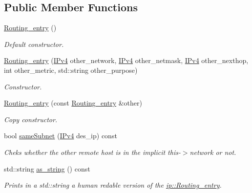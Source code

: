 \subsection*{Public Member Functions}
\begin{DoxyCompactItemize}
\item 
\hyperlink{structip_1_1Routing__entry_ac767d7b0debe508f51d671ed7c46df5f}{Routing\+\_\+entry} ()
\begin{DoxyCompactList}\small\item\em Default constructor. \end{DoxyCompactList}\item 
\hyperlink{structip_1_1Routing__entry_aa74e68d82782de83e6adaee3307d71c3}{Routing\+\_\+entry} (\hyperlink{structIPv4}{I\+Pv4} other\+\_\+network, \hyperlink{structIPv4}{I\+Pv4} other\+\_\+netmask, \hyperlink{structIPv4}{I\+Pv4} other\+\_\+nexthop, int other\+\_\+metric, std\+::string other\+\_\+purpose)
\begin{DoxyCompactList}\small\item\em Constructor. \end{DoxyCompactList}\item 
\hyperlink{structip_1_1Routing__entry_af365ea3a7377448bdaf58dd82795bfa1}{Routing\+\_\+entry} (const \hyperlink{structip_1_1Routing__entry}{Routing\+\_\+entry} \&other)
\begin{DoxyCompactList}\small\item\em Copy constructor. \end{DoxyCompactList}\item 
bool \hyperlink{structip_1_1Routing__entry_ae756d25da9d7cda6c2fe7aed59284b18}{same\+Subnet} (\hyperlink{structIPv4}{I\+Pv4} des\+\_\+ip) const 
\begin{DoxyCompactList}\small\item\em Cheks whether the other remote host is in the implicit this-\/$>$network or not. \end{DoxyCompactList}\item 
std\+::string \hyperlink{structip_1_1Routing__entry_ace4715a82faf3918f5cc75d1eb361f00}{as\+\_\+string} () const 
\begin{DoxyCompactList}\small\item\em Prints in a std\+::string a human redable version of the \hyperlink{structip_1_1Routing__entry}{ip\+::\+Routing\+\_\+entry}. \end{DoxyCompactList}\end{DoxyCompactItemize}
